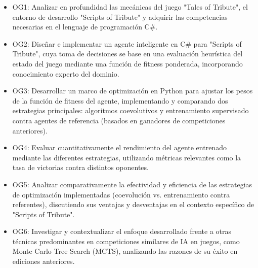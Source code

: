 \begin{itemize}
	\item OG1: Analizar en profundidad las mecánicas del juego "Tales of Tribute", el entorno de desarrollo "Scripts of Tribute" y adquirir las competencias necesarias en el lenguaje de programación C\#.
	\item OG2: Diseñar e implementar un agente inteligente en C\# para "Scripts of Tribute", cuya toma de decisiones se base en una evaluación heurística del estado del juego mediante una función de fitness ponderada, incorporando conocimiento experto del dominio.
	\item OG3: Desarrollar un marco de optimización en Python para ajustar los pesos de la función de fitness del agente, implementando y comparando dos estrategias principales: algoritmos coevolutivos y entrenamiento supervisado contra agentes de referencia (basados en ganadores de competiciones anteriores).
	\item OG4: Evaluar cuantitativamente el rendimiento del agente entrenado mediante las diferentes estrategias, utilizando métricas relevantes como la tasa de victorias contra distintos oponentes.
	\item OG5: Analizar comparativamente la efectividad y eficiencia de las estrategias de optimización implementadas (coevolución vs. entrenamiento contra referentes), discutiendo sus ventajas y desventajas en el contexto específico de "Scripts of Tribute".
	\item OG6: Investigar y contextualizar el enfoque desarrollado frente a otras técnicas predominantes en competiciones similares de IA en juegos, como Monte Carlo Tree Search (MCTS), analizando las razones de su éxito en ediciones anteriores. 
\end{itemize}